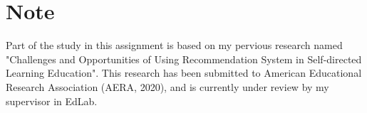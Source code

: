 \documentclass[man,biblatex,apacite]{apa6}
\begin{document}
\section{Note}

Part of the study in this assignment is based on my pervious research named "Challenges and Opportunities of Using Recommendation System in Self-directed Learning Education".
This research has been submitted to American Educational Research Association (AERA, 2020),  and is currently  under review by my supervisor in EdLab.

\clearpage

\end{document}

